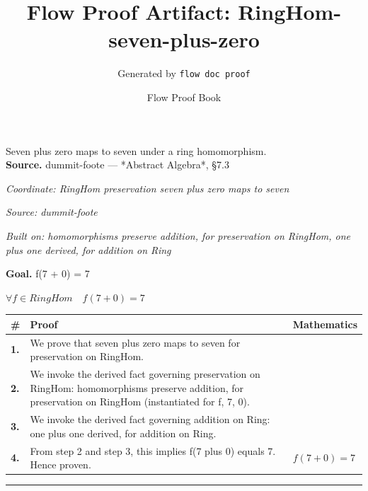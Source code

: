 \documentclass[11pt]{article}
\title{Flow Proof Artifact: RingHom-seven-plus-zero}
\author{Generated by \texttt{flow doc proof}}
\date{Flow Proof Book}
\theoremstyle{definition}
\begin{document}
\maketitle
Seven plus zero maps to seven under a ring homomorphism.\\[0.5em]
\textbf{Source.} dummit-foote — *Abstract Algebra*, §7.3\\[0.5em]
\bigskip
{}\par
\smallskip\noindent\textit{Coordinate: RingHom \cdot preservation \cdot seven plus zero maps to seven}\par
\smallskip\noindent\textit{Source: dummit-foote}\par
\smallskip\noindent\textit{Built on: homomorphisms preserve addition, for preservation on RingHom, one plus one derived, for addition on Ring}\par
\medskip
\noindent\textbf{Goal.} f(7 + 0) = 7\par
\noindent$\displaystyle \forall f \in RingHom\quad f(7 + 0) = 7$\par
\medskip
\noindent
\begin{tabular}{@{} >{\raggedright\arraybackslash}p{} >{\raggedright\arraybackslash}p{} >{\raggedleft\arraybackslash}p{} @{}}
\textbf{\#} & \textbf{Proof} & \textbf{Mathematics} \\
\midrule
\textbf{1.} & We prove that seven plus zero maps to seven for preservation on RingHom. & \\[0.45em]
\textbf{2.} & We invoke the derived fact governing preservation on RingHom: homomorphisms preserve addition, for preservation on RingHom (instantiated for f, 7, 0). & \\[0.45em]
\textbf{3.} & We invoke the derived fact governing addition on Ring: one plus one derived, for addition on Ring. & \\[0.45em]
\textbf{4.} & From step 2 and step 3, this implies f(7 plus 0) equals 7. Hence proven. & $\displaystyle f(7 + 0) = 7$ \\[0.45em]
\bottomrule
\end{tabular}
\label{thm:RingHom-preservation-seven_plus_zero_maps_to_seven}
\par\medskip\hrule
\end{document}
